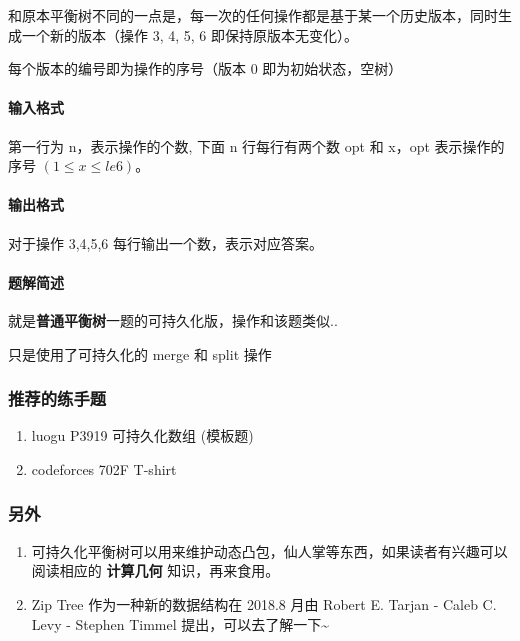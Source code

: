 和原本平衡树不同的一点是，每一次的任何操作都是基于某一个历史版本，同时生成一个新的版本（操作 3, 4, 5, 6 即保持原版本无变化）。

每个版本的编号即为操作的序号（版本 0 即为初始状态，空树）

\paragraph{输入格式}

第一行为 n，表示操作的个数, 下面 n 行每行有两个数 opt 和 x，opt 表示操作的序号 $(1 \leq x \leq  le6)$。

\paragraph{输出格式}

对于操作 3,4,5,6 每行输出一个数，表示对应答案。

\paragraph{题解简述}

就是\textbf{普通平衡树}一题的可持久化版，操作和该题类似..

只是使用了可持久化的 merge 和 split 操作

\subsubsection{推荐的练手题}

\begin{enumerate}
\item luogu P3919 可持久化数组 (模板题)
\item codeforces 702F T-shirt
\end{enumerate}

\subsubsection{另外}

\begin{enumerate}
\item 可持久化平衡树可以用来维护动态凸包，仙人掌等东西，如果读者有兴趣可以阅读相应的  \textbf{计算几何}  知识，再来食用。
\item Zip Tree 作为一种新的数据结构在 2018.8 月由 Robert E. Tarjan -  Caleb C. Levy - Stephen Timmel 提出，可以去了解一下\textasciitilde{}
\end{enumerate}
